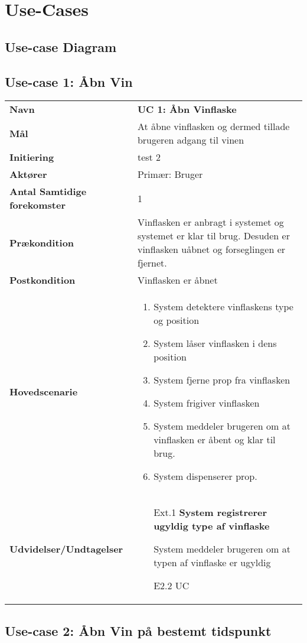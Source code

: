 \section{Use-Cases}

\subsection{Use-case Diagram}

\subsection{Use-case 1: Åbn Vin}


\begin{tabular}{>{\bfseries}p{100pt} p{300pt}}
	
	Navn & \bfseries{UC 1: Åbn Vinflaske} \\
	Mål & At åbne vinflasken og dermed tillade brugeren adgang til vinen\\
	Initiering & test 2 \\
	Aktører & Primær: Bruger \\
	Antal Samtidige forekomster & 1 \\
	Prækondition & Vinflasken er anbragt i systemet og systemet er klar til brug. Desuden er vinflasken uåbnet og forseglingen er fjernet. \\
	Postkondition & Vinflasken er åbnet \\
	Hovedscenarie & \begin{enumerate}
		\item System detektere vinflaskens type og position
		\subitem [Ext. 1: System registrerer ugyldig type af vinflaske]
		\subitem [Ext. 2: System kan ikke registrere en vinflaske] 
		\item System låser vinflasken i dens position
		\item System fjerne prop fra vinflasken
		\item System frigiver vinflasken
		\item System meddeler brugeren om at vinflasken er åbent og klar til brug.
		\item System dispenserer prop.
	\end{enumerate} \\
	Udvidelser/Undtagelser & 
	\begin{enumerate}{}{}
	\item[Ext.1] \bfseries{ System registrerer ugyldig type af vinflaske} 
	
		\subitem[1.1] System meddeler brugeren om at typen af vinflaske er ugyldig
		\item[E2.2] UC
	\end{enumerate}\\
\end{tabular}

\subsection{Use-case 2: Åbn Vin på bestemt tidspunkt}